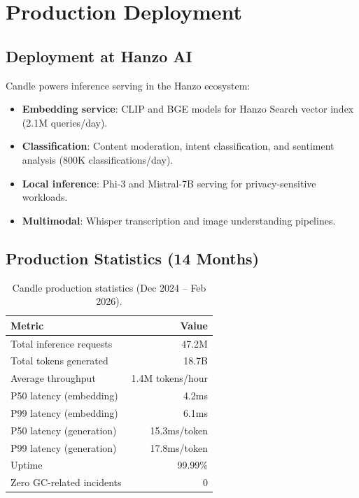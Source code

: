 \section{Production Deployment}

\label{sec:production}

\subsection{Deployment at Hanzo AI}

Candle powers inference serving in the Hanzo ecosystem:

\begin{itemize}[leftmargin=1.1em]
    \item \textbf{Embedding service}: CLIP and BGE models for Hanzo Search vector index (2.1M queries/day).
    \item \textbf{Classification}: Content moderation, intent classification, and sentiment analysis (800K classifications/day).
    \item \textbf{Local inference}: Phi-3 and Mistral-7B serving for privacy-sensitive workloads.
    \item \textbf{Multimodal}: Whisper transcription and image understanding pipelines.
\end{itemize}

\subsection{Production Statistics (14 Months)}

\begin{table}[H]
\centering
\begin{tabular}{lr}
\toprule
\textbf{Metric} & \textbf{Value} \\
\midrule
Total inference requests & 47.2M \\
Total tokens generated & 18.7B \\
Average throughput & 1.4M tokens/hour \\
P50 latency (embedding) & 4.2ms \\
P99 latency (embedding) & 6.1ms \\
P50 latency (generation) & 15.3ms/token \\
P99 latency (generation) & 17.8ms/token \\
Uptime & 99.99\% \\
Zero GC-related incidents & 0 \\
\bottomrule
\end{tabular}
\caption{Candle production statistics (Dec 2024 -- Feb 2026).}
\label{tab:prod_stats}
\end{table}


